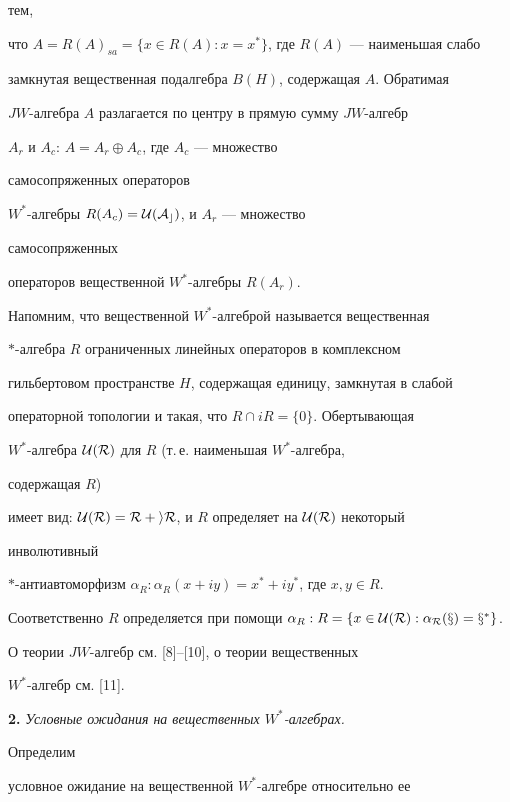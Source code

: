 тем, 


что $A=R(A)_{sa}=\{x\in R(A):x=x^*\}$, где $R(A)$ --- наименьшая слабо 


замкнутая вещественная подалгебра $B(H)$, содержащая $A$. Обратимая 


$JW$-алгебра $A$ разлагается по центру в прямую сумму $JW$-алгебр 


$A_r$ и $A_c$: $A=A_r\oplus A_c$, где $A_c$ --- множество 


самосопряженных операторов 


$W^*$-алгебры $R(A_c)=\cal U(A_c)$, и $A_r$ --- множество 


самосопряженных 


операторов вещественной $W^*$-алгебры $R(A_r)$. 


 


Напомним, что вещественной $W^*$-алгеброй называется вещественная 


$*$-алгебра $R$ ограниченных линейных операторов в комплексном 


гильбертовом пространстве $H$, содержащая единицу, замкнутая в слабой 


операторной топологии и такая, что $R\cap iR=\{0\}$. Обертывающая 


$W^*$-алгебра $\cal U(R)$ для $R$ (т.\,е. наименьшая $W^*$-алгебра, 


содержащая $R$) 


имеет вид: $\cal U(R)=R+iR$, и $R$ определяет на $\cal U(R)$ некоторый 


инволютивный 


$*$-антиавтоморфизм $\alpha_R:\alpha_R(x+iy)=x^*+iy^*$, где $x,y\in R$. 


Соответственно $R$ определяется при помощи $\alpha_R:R=\{x\in\cal 


U(R):\alpha_R(x)=x^*\}$. 


 


О теории $JW$-алгебр см. [8]--[10], о теории вещественных 


$W^*$-алгебр см. [11]. 


\medskip 


 


{\bf 2.} {\it Условные ожидания на вещественных $W^*$-алгебрах.} 


Определим 


условное ожидание на вещественной $W^*$-алгебре относительно ее 


